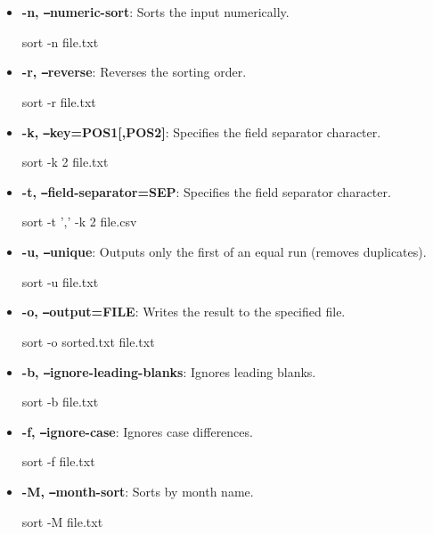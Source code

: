 \documentclass{report}
\begin{document}
    \begin{itemize}
        \item \textbf{-n, \texttt{--}numeric-sort}: Sorts the input numerically.
            \bigbreak \noindent 
            \begin{bashcode}
            sort -n file.txt
            \end{bashcode}
        \item \textbf{-r, \texttt{--}reverse}: Reverses the sorting order.
            \bigbreak \noindent 
            \begin{bashcode}
            sort -r file.txt
            \end{bashcode}
        \item \textbf{-k, \texttt{--}key=POS1[,POS2]}: Specifies the field separator character.
            \bigbreak \noindent 
            \begin{bashcode}
            sort -k 2 file.txt
            \end{bashcode}
        \item \textbf{-t, \texttt{--}field-separator=SEP}:  Specifies the field separator character.
            \bigbreak \noindent 
            \begin{bashcode}
            sort -t ',' -k 2 file.csv
            \end{bashcode}
        \item \textbf{-u, \texttt{--}unique}: Outputs only the first of an equal run (removes duplicates).
            \bigbreak \noindent 
            \begin{bashcode}
            sort -u file.txt
            \end{bashcode}
        \item \textbf{-o, \texttt{--}output=FILE}: Writes the result to the specified file.
            \bigbreak \noindent 
            \begin{bashcode}
            sort -o sorted.txt file.txt
            \end{bashcode}
        \item \textbf{-b, \texttt{--}ignore-leading-blanks}: Ignores leading blanks.
            \bigbreak \noindent 
            \begin{bashcode}
            sort -b file.txt            
            \end{bashcode}
        \item \textbf{-f, \texttt{--}ignore-case}: Ignores case differences.
            \bigbreak \noindent 
            \begin{bashcode}
            sort -f file.txt
            \end{bashcode}
        \item \textbf{-M, \texttt{--}month-sort}: Sorts by month name.
            \bigbreak \noindent 
            \begin{bashcode}
            sort -M file.txt
            \end{bashcode}
    \end{itemize}
\end{document}
